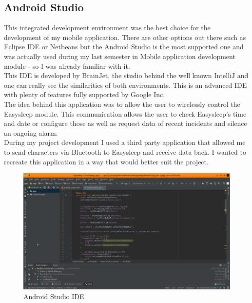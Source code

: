 \documentclass[12pt,a4paper]{article}
\begin{document}
		\subsection{Android Studio} 
		This integrated development environment was the best choice for the development of my mobile application. There are other options out there such as Eclipse IDE or Netbeans but the Android Studio is the most supported one and was actually used during my last semester in Mobile application development module - so I was already familiar with it.\\ 
		
		This IDE is developed by BrainJet, the studio behind the well known IntelliJ and one can really see the similarities of both environments. This is an advanced IDE with plenty of features fully supported by Google Inc.\\ 
		
		The idea behind this application was to allow the user to wirelessly control the Easysleep module. This communication allows the user to check Easysleep's time and date or configure those as well as request data of recent incidents and silence an ongoing alarm.\\
		
		During my project development I used a third party application that allowed me to send characters via Bluetooth to Easysleep and receive data back. I wanted to recreate this application in a way that would better suit the project.\\ 
		
		\begin{figure}[h]
		 \centering
		 \includegraphics[width=\textwidth]{android_studio.png}
		 \caption{Android Studio IDE}
		 \label{fig:androidStudio}
		\end{figure}
\end{document}
